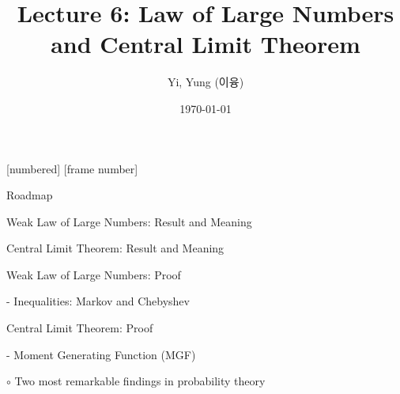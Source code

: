 

\csname\pdfmode\endcsname

{
  [numbered]
  [frame number]  %
}




\title[]{Lecture 6: Law of Large Numbers and Central Limit Theorem}
\author{Yi, Yung (이융)}
\date{\today}













\begin{frame}
  \titlepage
\end{frame}





\begin{frame}{Roadmap}

\plitemsep 0.15in

\bce[(1)]

\item Weak Law of Large Numbers: Result and Meaning
\item Central Limit Theorem: Result and Meaning
\item Weak Law of Large Numbers: Proof

- Inequalities: Markov and Chebyshev

\item Central Limit Theorem: Proof

- Moment Generating Function (MGF)


\medskip

\item[$\circ$] Two most remarkable findings in probability theory
\ece

\end{frame}


